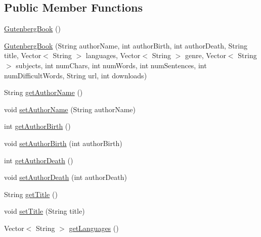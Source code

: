 \subsection*{Public Member Functions}
\begin{DoxyCompactItemize}
\item 
\mbox{\hyperlink{classbridges_1_1data__src__dependent_1_1_gutenberg_book_a34e237fe23613dad17e4b5e005077927}{Gutenberg\+Book}} ()
\item 
\mbox{\hyperlink{classbridges_1_1data__src__dependent_1_1_gutenberg_book_ab35292d8e1464ce388326cafe29ed713}{Gutenberg\+Book}} (String author\+Name, int author\+Birth, int author\+Death, String title, Vector$<$ String $>$ languages, Vector$<$ String $>$ genre, Vector$<$ String $>$ subjects, int num\+Chars, int num\+Words, int num\+Sentences, int num\+Difficult\+Words, String url, int downloads)
\item 
String \mbox{\hyperlink{classbridges_1_1data__src__dependent_1_1_gutenberg_book_a8f66ba5bea27dbecb1658add3a278e45}{get\+Author\+Name}} ()
\item 
void \mbox{\hyperlink{classbridges_1_1data__src__dependent_1_1_gutenberg_book_a6d6e1ccac0fc2e0b09aa6ac6fbe727bc}{set\+Author\+Name}} (String author\+Name)
\item 
int \mbox{\hyperlink{classbridges_1_1data__src__dependent_1_1_gutenberg_book_a00e6f487af339abaa5eb83d315abc3c6}{get\+Author\+Birth}} ()
\item 
void \mbox{\hyperlink{classbridges_1_1data__src__dependent_1_1_gutenberg_book_ad54dbb22312e98761ae3d19f3b94ff85}{set\+Author\+Birth}} (int author\+Birth)
\item 
int \mbox{\hyperlink{classbridges_1_1data__src__dependent_1_1_gutenberg_book_aa1b308207d35f65ceaf85a6bc919d0da}{get\+Author\+Death}} ()
\item 
void \mbox{\hyperlink{classbridges_1_1data__src__dependent_1_1_gutenberg_book_af9aef84c74d681c1a41cbc37698ced18}{set\+Author\+Death}} (int author\+Death)
\item 
String \mbox{\hyperlink{classbridges_1_1data__src__dependent_1_1_gutenberg_book_ae2d9bc547f329c9e6cc862e275b11f21}{get\+Title}} ()
\item 
void \mbox{\hyperlink{classbridges_1_1data__src__dependent_1_1_gutenberg_book_a1f4b11121296e76e4d5afc86157b52d4}{set\+Title}} (String title)
\item 
Vector$<$ String $>$ \mbox{\hyperlink{classbridges_1_1data__src__dependent_1_1_gutenberg_book_a75fffcba3f25be92c02fda1d42c9bcc4}{get\+Languages}} ()

\end{DoxyCompactItemize}
